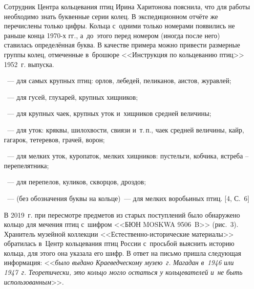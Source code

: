 

Сотрудник Центра кольцевания птиц Ирина Харитонова пояснила, что для работы необходимо знать буквенные серии колец. В экспедиционном отчёте же перечислены только цифры. Кольца с~одними только номерами появились не раньше конца 1970-х гг., а~до~этого перед номером (иногда после него) ставилась определённая буква. В качестве примера можно привести размерные группы колец, отмеченные в~брошюре <<Инструкция по кольцеванию птиц>> 1952~г. выпуска.

\begin{description}[noitemsep]\vspace{-10pt}
\item[Серия <<А>>]~--- для самых крупных птиц: орлов, лебедей, пеликанов, аистов, журавлей;
\item[Серия <<В>>]~--- для гусей, глухарей, крупных хищников;
\item[Серия <<С>>]~--- для крупных чаек, крупных уток и~хищников средней величины;
\item[Серия <<D>>]~--- для уток: кряквы, шилохвости, свиязи и~т.\,п., чаек средней величины, кайр, гагарок, тетеревов, грачей, ворон;
\item[Серия <<Е>>]~--- для мелких уток, куропаток, мелких хищников: пустельги, кобчика, ястреба – перепелятника;

\item[Серия <<F>>]~--- для перепелов, куликов, скворцов, дроздов;
\item[Серия <<G>>]~--- (без обозначения буквы на кольце)~--- для мелких воробьиных птиц. [4, С.~6]\enlargethispage{2\baselineskip}
\end{description}\vspace{-8pt}



В 2019~г. при пересмотре предметов из старых поступлений было обнаружено кольцо для мечения птиц с~шифром <<БЮН MOSKWA 9506~B>> (рис.~3). Хранитель музейной коллекции <<Естественно-исторические материалы>> обратилась в~Центр кольцевания птиц России с~просьбой выяснить историю кольца, для этого она указала его шифр. В ответ на письмо пришла следующая информация: <<\textit{ было выдано Краеведческому музею~г. Магадан в~1946 или 1947~г. Теоретически, это кольцо могло остаться у кольцевателей и~не быть использованным}>>.


